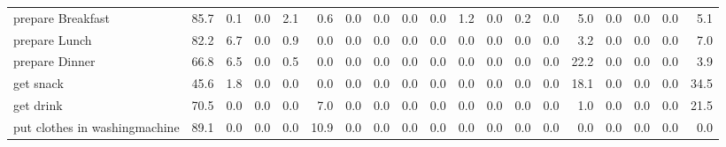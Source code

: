 \documentclass{article}
\begin{document}
\begin{sideways}
\begin{tabular}{lrrrrrrrrrrrrrrrrrr}
prepare Breakfast             &        85.7 &                0.1 &           0.0 &                          2.1 &                0.6 &                0.0 &                        0.0 &          0.0 &              0.0 &                1.2 &                    0.0 &                      0.2 &                  0.0 &                   5.0 &              0.0 &              0.0 &                                  0.0 &          5.1 \\
prepare Lunch                 &        82.2 &                6.7 &           0.0 &                          0.9 &                0.0 &                0.0 &                        0.0 &          0.0 &              0.0 &                0.0 &                    0.0 &                      0.0 &                  0.0 &                   3.2 &              0.0 &              0.0 &                                  0.0 &          7.0 \\
prepare Dinner                &        66.8 &                6.5 &           0.0 &                          0.5 &                0.0 &                0.0 &                        0.0 &          0.0 &              0.0 &                0.0 &                    0.0 &                      0.0 &                  0.0 &                  22.2 &              0.0 &              0.0 &                                  0.0 &          3.9 \\
get snack                     &        45.6 &                1.8 &           0.0 &                          0.0 &                0.0 &                0.0 &                        0.0 &          0.0 &              0.0 &                0.0 &                    0.0 &                      0.0 &                  0.0 &                  18.1 &              0.0 &              0.0 &                                  0.0 &         34.5 \\
get drink                     &        70.5 &                0.0 &           0.0 &                          0.0 &                7.0 &                0.0 &                        0.0 &          0.0 &              0.0 &                0.0 &                    0.0 &                      0.0 &                  0.0 &                   1.0 &              0.0 &              0.0 &                                  0.0 &         21.5 \\
put clothes in washingmachine &        89.1 &                0.0 &           0.0 &                          0.0 &               10.9 &                0.0 &                        0.0 &          0.0 &              0.0 &                0.0 &                    0.0 &                      0.0 &                  0.0 &                   0.0 &              0.0 &              0.0 &                                  0.0 &          0.0 \\

\end{tabular}
\end{sideways}
\end{document}
